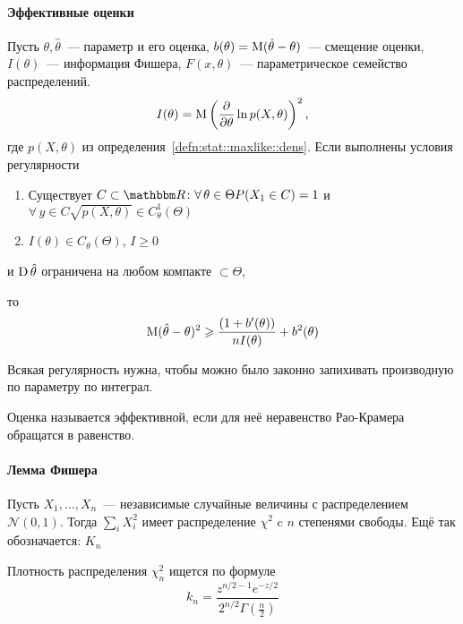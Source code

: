 \documentclass[12pt,timbord]{../../../notes}
\begin{document}


\paragraph*{Эффективные оценки}\label{par:stat::eff}

\begin{prop}\label{prop:stat::eff::rao}
  Пусть $\theta, \hat\theta$~--- параметр и его оценка, $b(\theta) = \operatorname{M} (\hat\theta -
  \theta)$~--- смещение оценки, $I(\theta)$~--- информация Фишера, $F(x,\theta)$~---
  параметрическое семейство распределений.
  \[
    I(\theta) = \operatorname{M} \left( \frac{\partial }{\partial \theta} \ln p(X, \theta)\right)^2,
  \]
  где $p(X,\theta)$ из определения~\ref{defn:stat::maxlike::dens}. Если выполнены условия
  регулярности
  \begin{enumerate}
    \item Существует $C\subset\R \colon \forall\, \theta\in \Theta P(X_1 \in C) =1 $ и $\forall\,
      y \in C \sqrt{p(X, \theta)} \in C^1_\theta (\Theta)$
    \item $I(\theta) \in C_\theta(\Theta)$, $I \geqslant 0$
  \end{enumerate}
  и $\operatorname{D} \hat \theta $ ограничена на любом компакте $\subset \Theta$, 
  
  то
  \[
    \operatorname{M} (\hat\theta - \theta)^2 \geqslant \frac{(1+b'(\theta))}{n I(\theta)} + b^2(\theta) 
  \]
\end{prop}
\begin{rem}\label{rem:stat::eff::reg}
  Всякая регулярность нужна, чтобы можно было законно запихивать производную по параметру по
  интеграл. 
\end{rem}

\begin{defn}\label{defn:stat::eff::eff}
  Оценка называется эффективной, если для неё неравенство Рао-Крамера обращатся в равенство.
\end{defn}

\paragraph{Лемма Фишера}
\label{par:stat::fishlem}

\begin{defn}\label{defn:stat::fishlem::chi}
  Пусть $X_1, \dotsc, X_n$~--- независимые случайные величины с распределением $\mathcal N(0,1)$.
  Тогда $\sum_i X_i^2$ имеет распределение $\chi^2$ c $n$ степенями свободы. Ещё так обозначается:
  $K_n$
\end{defn}
\begin{prop}\label{prop:stat::fishlem::chidens}
  Плотность распределения $\chi^2_n$ ищется по формуле \[\displaystyle k_n = \frac{z^{n/2-1}
  e^{-z/2}}{2^{n/2} \Gamma \left(\frac{n}{2} \right)} \]
\end{prop}
\end{document}
